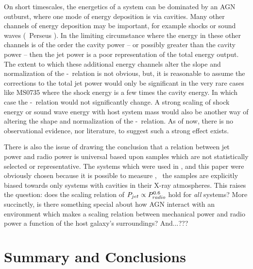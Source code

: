 \documentclass{emulateapj}
\begin{document}
On short timescales, the energetics of a system can be dominated by an
AGN outburst, where one mode of energy deposition is via
cavities. Many other channels of energy deposition may be important,
for example shocks \citep{ms0735, hydraa, herca, 2005ApJ...635..894F,
  2006MNRAS.371L..65S} or sound waves (\eg\ Perseus
\citep{perseus3}). In the limiting circumstance where the energy in
these other channels is of the order the cavity power -- or possibly
greater than the cavity power \citep{2006MNRAS.373..739N} -- then the
jet power is a poor representation of the total energy output. The
extent to which these additional energy channels alter the slope and
normalization of the \pcav-\prad\ relation is not obvious, but, it is
reasonable to assume the corrections to the total jet power would only
be significant in the very rare cases like MS0735 where the shock
energy is a few times the cavity energy. In which case the
\pcav-\prad\ relation would not significantly change. A strong scaling
of shock energy or sound wave energy with host system mass would also
be another way of altering the shape and normalization of the
\pcav-\prad\ relation. As of now, there is no observational evidence,
nor literature, to suggest such a strong effect exists.

There is also the issue of drawing the conclusion that a relation
between jet power and radio power is universal based upon samples
which are not statistically selected or representative. The systems
which were used in \citet{birzan04, birzan08}, and this paper were
obviously chosen because it is possible to measure \pcav, \eg\ the
samples are explicitly biased towards only systems with cavities in
their X-ray atmospheres. This raises the question: does the scaling
relation of $P_{jet} \propto P_{radio}^{0.6}$ hold for {\it{all}} systems?
More succinctly, is there something special about how AGN interact
with an environment which makes a scaling relation between mechanical
power and radio power a function of the host galaxy's surroundings?
And...???

\section{Summary and Conclusions}
\label{sec:summary}
\end{document}
